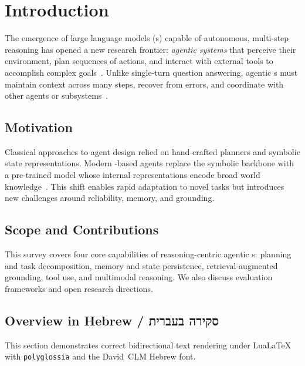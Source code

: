 \chapter{Introduction}
\label{chap:introduction}

The emergence of large language models (\LLM{}s) capable of autonomous,
multi-step reasoning has opened a new research frontier: \emph{agentic
systems} that perceive their environment, plan sequences of actions, and
interact with external tools to accomplish complex goals~\cite{wei2026agenticreasoning}.
Unlike single-turn question answering, agentic \LLM{}s must maintain context
across many steps, recover from errors, and coordinate with other agents or
subsystems~\cite{ke2025reasoningfrontiers}.

\section{Motivation}
\label{sec:intro-motivation}

Classical approaches to agent design relied on hand-crafted planners and
symbolic state representations.  Modern \LLM{}-based agents replace the
symbolic backbone with a pre-trained model whose internal representations
encode broad world knowledge~\cite{wei2026agenticreasoning}.
This shift enables rapid adaptation to novel tasks but introduces new
challenges around reliability, memory, and grounding.

\section{Scope and Contributions}
\label{sec:intro-scope}

This survey covers four core capabilities of reasoning-centric agentic
\LLM{}s: planning and task decomposition, memory and state persistence,
retrieval-augmented grounding, tool use, and multimodal reasoning.
We also discuss evaluation frameworks and open research directions.

\section{Overview in Hebrew / סקירה בעברית}
\label{sec:intro-bidi}

This section demonstrates correct bidirectional text rendering under
LuaLaTeX with \texttt{polyglossia} and the David~CLM Hebrew font.

